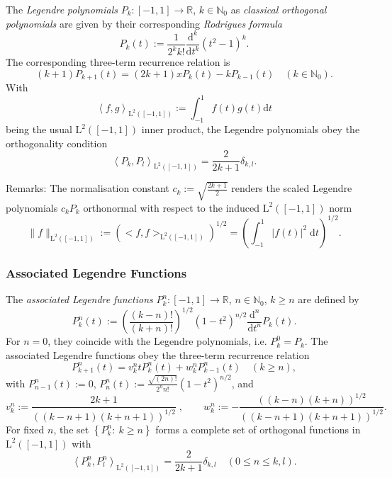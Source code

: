 The {\em Legendre\/} {\em polynomials\/} $P_k : [-1,1] \rightarrow \mathbb{R}$, $k \in \mathbb{N}_{0}$ as {\em classical\/} {\em orthogonal\/} {\em polynomials\/} are given by their corresponding {\em Rodrigues\/} {\em formula\/} \[ P_k(t) := \frac{1}{2^k k!} \frac{\text{d}^k}{\text{d} t^k} \left(t^2-1\right)^k. \] The corresponding three-term recurrence relation is \[ (k+1)P_{k+1}(t) = (2k+1) x P_{k}(t) - k P_{k-1}(t) \quad (k \in \mathbb{N}_0). \] With \[ \left< f,g \right>_{\text{L}^2\left([-1,1]\right)} := \int_{-1}^{1} f(t) g(t) \text{d} t \] being the usual $\text{L}^2\left([-1,1]\right)$ inner product, the Legendre polynomials obey the orthogonality condition \[ \left< P_k,P_l \right>_{\text{L}^2\left([-1,1]\right)} = \frac{2}{2k+1} \delta_{k,l}. \]

\begin{Desc}
\item[Remarks:]The normalisation constant $ c_k := \sqrt{\frac{2k+1}{2}}$ renders the scaled Legendre polynomials $c_k P_k$ orthonormal with respect to the induced $\text{L}^2\left([-1,1]\right)$ norm \[ \|f\|_{\text{L}^2\left([-1,1]\right)} := \left(<f,f>_{\text{L}^2\left([-1,1]\right)}\right)^{1/2} = \left(\int_{-1}^{1} |f(t)|^2 \; \text{d} t\right)^{1/2}. \]\end{Desc}
\hypertarget{group__nfsft_alf}{}\subsubsection{Associated Legendre Functions}\label{group__nfsft_alf}
The {\em associated\/} {\em Legendre\/} {\em functions\/} $P_k^n : [-1,1] \rightarrow \mathbb{R} $, $n \in \mathbb{N}_0$, $k \ge n$ are defined by \[ P_k^n(t) := \left(\frac{(k-n)!}{(k+n)!}\right)^{1/2} \left(1-t^2\right)^{n/2} \frac{\text{d}^n}{\text{d} t^n} P_k(t). \] For $n = 0$, they coincide with the Legendre polynomials, i.e. $P_k^0 = P_k$. The associated Legendre functions obey the three-term recurrence relation \[ P_{k+1}^n(t) = v_{k}^n t P_k^n(t) + w_{k}^n P_{k-1}^n(t) \quad (k \ge n), \] with $P_{n-1}^n(t) := 0$, $P_{n}^n(t) := \frac{\sqrt{(2n)!}}{2^n n!} \left(1-t^2\right)^{n/2}$, and \[ v_{k}^n := \frac{2k+1}{((k-n+1)(k+n+1))^{1/2}}\; ,\qquad w_{k}^n := - \frac{((k-n)(k+n))^{1/2}}{((k-n+1)(k+n+1))^{1/2}}. \] For fixed $n$, the set $\left\{P_k^n:\: k \ge n\right\}$ forms a complete set of orthogonal functions in $\text{L}^2\left([-1,1]\right)$ with \[ \left< P_k^n,P_l^n \right>_{\text{L}^2\left([-1,1]\right)} = \frac{2}{2k+1} \delta_{k,l} \quad (0 \le n \le k,l). \]

